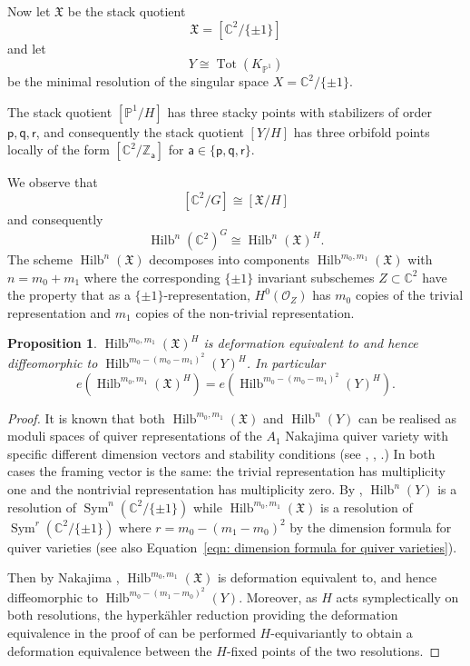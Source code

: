 \documentclass{amsart}
\newtheorem{proposition}[theorem]{Proposition}
\theoremstyle{definition}
\newcommand{\CC} {{\mathbb C}}          %
\newcommand{\ZZ} {{\mathbb Z}}		%
\newcommand{\PP}{\mathbb{P}}
\newcommand{\X}{\mathfrak{X}}
\renewcommand{\O}{\mathcal{O}}
\newcommand{\varp}{\mathsf{p}}
\newcommand{\varq}{\mathsf{q}}
\newcommand{\varr}{\mathsf{r}}
\newcommand{\vara}{\mathsf{a}}
\newcommand{\Sym}{\operatorname{Sym}}
\newcommand{\Hilb}{\operatorname{Hilb}}
\newcommand{\jim}{\color{red}}
\begin{document}
\bigskip

Now let $\X$ be the stack quotient
\[
\X=[\CC^{2}/ \{\pm 1 \}]
\]
and let
\[
Y\cong \operatorname{Tot}(K_{\PP^{1}})
\]
be the minimal resolution of the singular space $X=\CC^{2}/\{\pm 1
\}$.

The stack quotient $[\PP^{1}/H]$ has three stacky points with
stabilizers of order $\varp ,\varq ,\varr$, and consequently the stack
quotient $[Y/H]$ has three orbifold points locally of the form
$[\CC^{2}/\ZZ_{\vara }]$ for $\vara \in \{\varp ,\varq ,\varr \}$.


We observe that 
\[
 [\CC^{2}/G ] \cong [\X /H ]
\]
and consequently
\[
\Hilb^{n}(\CC^{2})^{G}  \cong \Hilb^{n}(\X )^{H} .
\]
The scheme $ \Hilb^{n}(\X )$ decomposes into components
$\Hilb^{m_{0},m_{1}}(\X )$ with $n=m_{0}+m_{1}$ where the
corresponding $\{\pm 1 \}$ invariant subschemes $Z\subset \CC^{2}$
have the property that as a $\{\pm 1 \}$-representation,
$H^{0}(\O_{Z})$ has $m_{0}$ copies of the trivial representation and
$m_{1}$ copies of the non-trivial representation.


\begin{proposition}\label{prop: Hilb(X,m0,m1) = Hilb(Y,m0-(m0-m1)^2)}
$\Hilb^{m_{0},m_{1}}(\X )^{H}$ is deformation equivalent to and hence
diffeomorphic to $\Hilb^{m_{0}-(m_{0}-m_{1})^{2}}(Y)^{H}$. In
particular
\[
e\left(\Hilb^{m_{0},m_{1}}(\X )^{H} \right)
=e\left(\Hilb^{m_{0}-(m_{0}-m_{1})^{2}}(Y)^{H} \right). 
\]
\end{proposition}
{\jim 
\begin{proof}
It is known that both $\Hilb^{m_{0},m_{1}}(\X )$ and $\Hilb^{n}(Y)$
can be realised as moduli spaces of quiver representations of the
$A_{1}$ Nakajima quiver variety with specific different dimension
vectors and stability conditions (see \cite[Corollary
1.3]{bellamy2020birational}, \cite[Proposition 5.2]{craw2021quot},
\cite[page 2]{Kuznetsov}.)  In both cases the framing vector is the
same: the trivial representation has multiplicity one and the
nontrivial representation has multiplicity zero.  By \cite[Sections~2
and 3]{nakajima2002geometric}, $\Hilb^{n}(Y)$ is a resolution of
$\Sym^{n} (\CC^{2}/\{\pm 1\} )$ while $\Hilb^{m_{0},m_{1}}(\X )$ is a
resolution of $\Sym^{r} (\CC^{2}/\{\pm 1\})$ where
$r=m_{0}-(m_{1}-m_{0})^{2}$ by the dimension formula for quiver
varieties \cite[(2.6)]{Nakajima1994Duke} (see also
Equation~\eqref{eqn: dimension formula for quiver varieties}).

Then by Nakajima \cite[Cor~4.2]{Nakajima1994Duke},
$\Hilb^{m_{0},m_{1}}(\X )$ is deformation equivalent to, and hence
diffeomorphic to $\Hilb^{m_{0}-(m_{1}-m_{0})^{2}}(Y)$. Moreover, as
$H$ acts symplectically on both resolutions, the hyperk\"ahler
reduction providing the deformation equivalence in the proof of
\cite[Cor~4.2]{Nakajima1994Duke} can be performed $H$-equivariantly to
obtain a deformation equivalence between the $H$-fixed points of the
two resolutions.

\end{proof}

}%
\end{document}
